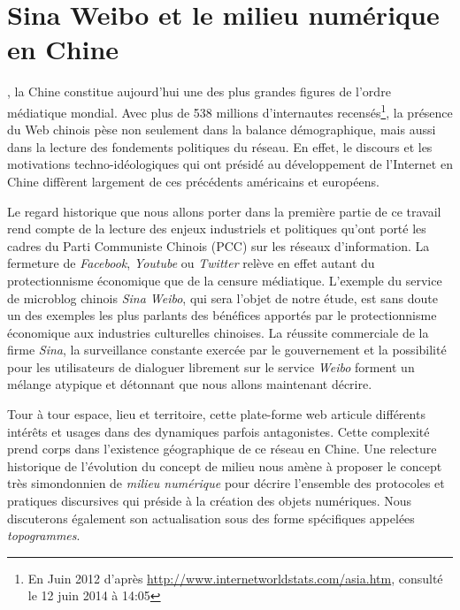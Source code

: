 ﻿\chapter{Sina Weibo et le milieu numérique en Chine} 

, la Chine constitue aujourd'hui une des plus grandes figures de l'ordre médiatique mondial. Avec plus de 538 millions d'internautes recensés\footnote{En Juin 2012 d'après  \url{http://www.internetworldstats.com/asia.htm}, consulté le 12 juin 2014 à 14:05}, la présence du Web chinois pèse non seulement dans la balance démographique, mais aussi dans la lecture des fondements politiques du réseau. En effet, le discours et les motivations techno-idéologiques qui ont présidé au développement de l'Internet en Chine diffèrent largement de ces précédents américains et européens. 

Le regard historique que nous allons porter dans la première partie de ce travail rend compte de la lecture des enjeux industriels et politiques qu'ont porté les cadres du Parti Communiste Chinois (PCC) sur les réseaux d'information. La fermeture de \textit{Facebook}, \textit{Youtube} ou \textit{Twitter} relève en effet autant du protectionnisme économique que de la censure médiatique. L'exemple du service de microblog chinois \textit{Sina Weibo}, qui sera l'objet de notre étude, est sans doute un des exemples les plus parlants des bénéfices apportés par le protectionnisme économique aux industries culturelles chinoises. La réussite commerciale de la firme \textit{Sina}, la surveillance constante exercée par le gouvernement et la  possibilité pour les utilisateurs de dialoguer librement sur le service \textit{Weibo} forment un mélange atypique et détonnant que nous allons maintenant décrire.

Tour à tour espace, lieu et territoire, cette plate-forme web articule  différents intérêts et usages dans des dynamiques parfois antagonistes. Cette complexité prend corps dans l'existence géographique de ce réseau en Chine. Une relecture historique de l'évolution du concept de milieu nous amène à proposer le concept très simondonnien de \textit{milieu numérique} pour décrire l’ensemble des protocoles et pratiques discursives qui préside à la création des objets numériques. Nous discuterons également son actualisation sous des forme spécifiques appelées \textit{topogrammes}.


